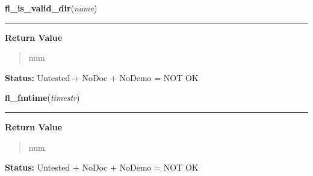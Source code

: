 \hspace{.8\funcindent}\begin{boxedminipage}{\funcwidth}

    \raggedright \textbf{fl\_is\_valid\_dir}(\textit{name})

    \vspace{-1.5ex}

    \rule{\textwidth}{0.5\fboxrule}
\setlength{\parskip}{2ex}
\setlength{\parskip}{1ex}
      \textbf{Return Value}
    \vspace{-1ex}

      \begin{quote}
      num

      \end{quote}

\textbf{Status:} Untested + NoDoc + NoDemo = NOT OK



    \end{boxedminipage}

    \label{xformslib:flfilesys:fl_fmtime}

    \vspace{0.5ex}

\hspace{.8\funcindent}\begin{boxedminipage}{\funcwidth}

    \raggedright \textbf{fl\_fmtime}(\textit{timestr})

    \vspace{-1.5ex}

    \rule{\textwidth}{0.5\fboxrule}
\setlength{\parskip}{2ex}
\setlength{\parskip}{1ex}
      \textbf{Return Value}
    \vspace{-1ex}

      \begin{quote}
      num

      \end{quote}

\textbf{Status:} Untested + NoDoc + NoDemo = NOT OK



    \end{boxedminipage}

    \label{xformslib:flfilesys:fl_fix_dirname}

